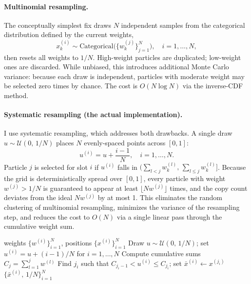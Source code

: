 \documentclass{article}
\begin{document}
\paragraph{Multinomial resampling.}
The conceptually simplest fix draws $N$ independent samples from the categorical distribution defined by the current weights,
\begin{equation}
    x_k^{(i)} \sim \mathrm{Categorical}\!\bigl(\{w_k^{(j)}\}_{j=1}^N\bigr), \quad i = 1, \ldots, N,
\end{equation}
then resets all weights to $1/N$. High-weight particles are duplicated; low-weight ones are discarded. While unbiased, this introduces additional Monte Carlo variance: because each draw is independent, particles with moderate weight may be selected zero times by chance. The cost is $O(N \log N)$ via the inverse-CDF method.

\paragraph{Systematic resampling (the actual implementation).}
I use systematic resampling, which addresses both drawbacks. A single draw $u \sim \mathcal{U}(0,\,1/N)$ places $N$ evenly-spaced points across $[0, 1]$:
\begin{equation}
    u^{(i)} = u + \frac{i-1}{N}, \quad i = 1, \ldots, N.
\end{equation}
Particle $j$ is selected for slot $i$ if $u^{(i)}$ falls in $\bigl(\sum_{l < j} w_k^{(l)},\, \sum_{l \leq j} w_k^{(l)}\bigr]$. Because the grid is deterministically spread over $[0,1]$, every particle with weight $w^{(j)} > 1/N$ is guaranteed to appear at least $\lfloor N w^{(j)} \rfloor$ times, and the copy count deviates from the ideal $N w^{(j)}$ by at most 1. This eliminates the random clustering of multinomial resampling, minimizes the variance of the resampling step, and reduces the cost to $O(N)$ via a single linear pass through the cumulative weight sum.

\begin{algorithm}[H]
\caption{Systematic Resampling}
\label{alg:systematic}
\begin{algorithmic}[1]
\REQUIRE weights $\{w^{(i)}\}_{i=1}^N$, positions $\{x^{(i)}\}_{i=1}^N$
\STATE Draw $u \sim \mathcal{U}(0,\, 1/N)$; set $u^{(i)} = u + (i-1)/N$ for $i = 1,\ldots,N$
\STATE Compute cumulative sums $C_j = \sum_{l=1}^{j} w^{(l)}$
    \STATE Find $j_i$ such that $C_{j_i-1} < u^{(i)} \leq C_{j_i}$;\; set $\bar{x}^{(i)} \leftarrow x^{(j_i)}$
\ENDFOR
\ENSURE $\{\bar{x}^{(i)},\, 1/N\}_{i=1}^N$
\end{algorithmic}
\end{algorithm}
\end{document}
